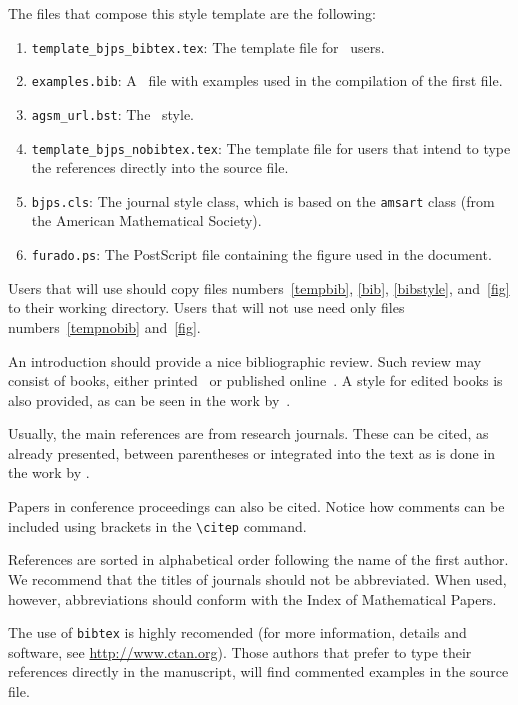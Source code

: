 \documentclass[12pt,twoside,reqno,final]{bjps}
\theoremstyle{plain}
\numberwithin{equation}{section}
\begin{document}
The files that compose this style template are the following:
\begin{enumerate}
\item\label{tempbib} \verb+template_bjps_bibtex.tex+: The template file for \BibTeX\ users.
\item\label{bib} \verb+examples.bib+: A \BibTeX\ file with examples used in the compilation of the first file.
\item\label{bibstyle} \verb+agsm_url.bst+: The \BibTeX\ style.
\item\label{tempnobib} \verb+template_bjps_nobibtex.tex+: The template file for users that intend to type the references directly into the source file.
\item\label{class} \verb+bjps.cls+: The journal style class, which is based on the \verb+amsart+ class (from the American Mathematical Society). 
\item\label{fig} \verb+furado.ps+: The PostScript file containing the figure used in the document. 
\end{enumerate}
Users that will use \BibTeX should copy files numbers~\ref{tempbib}, \ref{bib}, \ref{bibstyle}, and~\ref{fig} to their working directory.
Users that will not use \BibTeX need only files numbers~\ref{tempnobib} and~\ref{fig}.


An introduction should provide a nice bibliographic review.
Such review may consist of books, either printed~\citep{MaronnaMartinYohai:book:2006} or published online~\citep{manski_analog}.
A style for edited books is also provided, as can be seen in the work by~\citet{Matthews01}.

Usually, the main references are from research journals.
These can be cited, as already presented, between parentheses \citep{AllendeFreryetal:JSCS:05} or integrated into the text as is done in the work by \citet{Nakamuraetal:ACMCSUR}.

Papers in conference proceedings \citep[as, e.g., the work by][]{FreryFerrero:Sibgrapi:2006} can also be cited.
Notice how comments can be included using brackets in the \verb+\citep+ command.

References are sorted in alphabetical order following the name of the first author.
We recommend that the titles of journals should not be abbreviated.
When used, however, abbreviations should conform with the Index of Mathematical Papers.

The use of \verb+bibtex+ is highly recomended (for more information, details and software, see \url{http://www.ctan.org}).
Those authors that prefer to type their references directly in the manuscript, will find commented examples in the source file.
\end{document}
